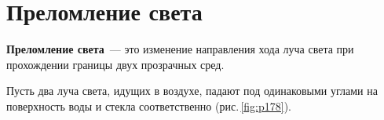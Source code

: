 \documentclass[main.tex]{subfiles}
\begin{document}

\pagestyle{empty}

 

\setcounter{section}{3
}
\addtocounter{section}{-1} 

\section{Преломление света}


\textbf{Преломление света}~--- это изменение направления хода луча света при прохождении границы двух прозрачных сред.

Пусть два луча света, идущих в воздухе, падают под одинаковыми углами на поверхность воды и стекла соответственно (рис.\,\ref{fig:p178}).
\end{document}
